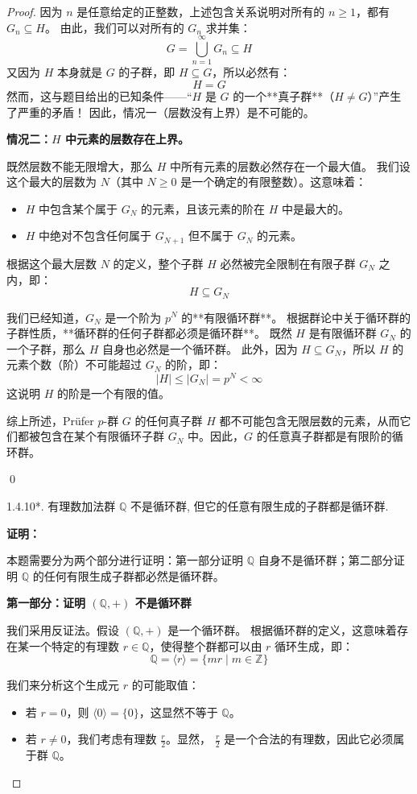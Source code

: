 \documentclass[]{article}
\begin{document}
\begin{proof}
因为 $n$ 是任意给定的正整数，上述包含关系说明对所有的 $n \ge 1$，都有 $G_n \subseteq H$。
由此，我们可以对所有的 $G_n$ 求并集：
\[ G = \bigcup_{n=1}^{\infty} G_n \subseteq H \]
又因为 $H$ 本身就是 $G$ 的子群，即 $H \subseteq G$，所以必然有：
\[ H = G \]
然而，这与题目给出的已知条件——“$H$ 是 $G$ 的一个**真子群**（$H \neq G$）”产生了严重的矛盾！
因此，情况一（层数没有上界）是不可能的。

\bigskip
\noindent \textbf{情况二：$H$ 中元素的层数存在上界。}

既然层数不能无限增大，那么 $H$ 中所有元素的层数必然存在一个最大值。
我们设这个最大的层数为 $N$（其中 $N \ge 0$ 是一个确定的有限整数）。这意味着：
\begin{itemize}
	\item $H$ 中包含某个属于 $G_N$ 的元素，且该元素的阶在 $H$ 中是最大的。
	\item $H$ 中绝对不包含任何属于 $G_{N+1}$ 但不属于 $G_N$ 的元素。
\end{itemize}
根据这个最大层数 $N$ 的定义，整个子群 $H$ 必然被完全限制在有限子群 $G_N$ 之内，即：
\[ H \subseteq G_N \]

我们已经知道，$G_N$ 是一个阶为 $p^N$ 的**有限循环群**。
根据群论中关于循环群的子群性质，**循环群的任何子群都必须是循环群**。
既然 $H$ 是有限循环群 $G_N$ 的一个子群，那么 $H$ 自身也必然是一个循环群。
此外，因为 $H \subseteq G_N$，所以 $H$ 的元素个数（阶）不可能超过 $G_N$ 的阶，即：
\[ |H| \le |G_N| = p^N < \infty \]
这说明 $H$ 的阶是一个有限的值。

\bigskip
综上所述，Prüfer $p$-群 $G$ 的任何真子群 $H$ 都不可能包含无限层数的元素，从而它们都被包含在某个有限循环子群 $G_N$ 中。因此，$G$ 的任意真子群都是有限阶的循环群。

\qed

1.4.10*. 有理数加法群 $\mathbb{Q}$ 不是循环群, 但它的任意有限生成的子群都是循环群. 

\bigskip
\noindent \textbf{证明：} 

本题需要分为两个部分进行证明：第一部分证明 $\mathbb{Q}$ 自身不是循环群；第二部分证明 $\mathbb{Q}$ 的任何有限生成子群都必然是循环群。

\bigskip
\noindent \textbf{第一部分：证明 $(\mathbb{Q}, +)$ 不是循环群}

我们采用反证法。假设 $(\mathbb{Q}, +)$ 是一个循环群。
根据循环群的定义，这意味着存在某一个特定的有理数 $r \in \mathbb{Q}$，使得整个群都可以由 $r$ 循环生成，即：
\[ \mathbb{Q} = \langle r \rangle = \{ mr \mid m \in \mathbb{Z} \} \]

我们来分析这个生成元 $r$ 的可能取值：
\begin{itemize}
	\item 若 $r = 0$，则 $\langle 0 \rangle = \{0\}$，这显然不等于 $\mathbb{Q}$。
	\item 若 $r \neq 0$，我们考虑有理数 $\frac{r}{2}$。显然， $\frac{r}{2}$ 是一个合法的有理数，因此它必须属于群 $\mathbb{Q}$。
\end{itemize}


\end{proof}
\end{document}
